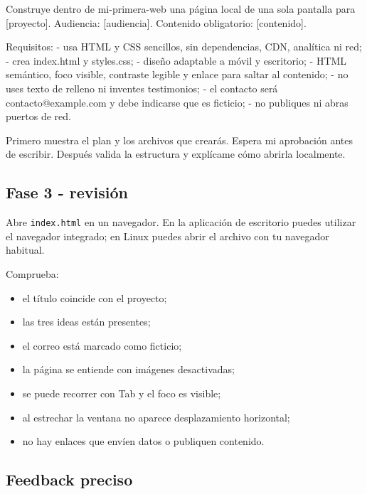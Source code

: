 \documentclass[10pt,a4paper,openany]{book}
\providecommand{\tightlist}{\setlength{\itemsep}{0.18em}\setlength{\parskip}{0pt}}
\newenvironment{Shaded}{}{}
\newcommand{\NormalTok}[1]{#1}
\renewenvironment{Shaded}
  {\begin{tcolorbox}[
    enhanced,
    breakable,
    colback=CodeBg,
    colframe=Border,
    boxrule=0.5pt,
    arc=2mm,
    left=3mm,
    right=3mm,
    top=2.2mm,
    bottom=2.2mm,
    before skip=0.8em,
    after skip=0.9em
  ]}
  {\end{tcolorbox}}
\begin{document}
\begin{Shaded}
\begin{Highlighting}[]
\NormalTok{Construye dentro de mi{-}primera{-}web una página local de una sola pantalla para}
\NormalTok{[proyecto]. Audiencia: [audiencia]. Contenido obligatorio: [contenido].}

\NormalTok{Requisitos:}
\NormalTok{{-} usa HTML y CSS sencillos, sin dependencias, CDN, analítica ni red;}
\NormalTok{{-} crea index.html y styles.css;}
\NormalTok{{-} diseño adaptable a móvil y escritorio;}
\NormalTok{{-} HTML semántico, foco visible, contraste legible y enlace para saltar al contenido;}
\NormalTok{{-} no uses texto de relleno ni inventes testimonios;}
\NormalTok{{-} el contacto será contacto@example.com y debe indicarse que es ficticio;}
\NormalTok{{-} no publiques ni abras puertos de red.}

\NormalTok{Primero muestra el plan y los archivos que crearás. Espera mi aprobación antes}
\NormalTok{de escribir. Después valida la estructura y explícame cómo abrirla localmente.}
\end{Highlighting}
\end{Shaded}

\subsection{Fase 3 - revisión}\label{fase-3---revisiuxf3n}

Abre \texttt{index.html} en un navegador. En la aplicación de escritorio
puedes utilizar el navegador integrado; en Linux puedes abrir el archivo
con tu navegador habitual.

Comprueba:

\begin{itemize}
\tightlist
\item
  el título coincide con el proyecto;
\item
  las tres ideas están presentes;
\item
  el correo está marcado como ficticio;
\item
  la página se entiende con imágenes desactivadas;
\item
  se puede recorrer con Tab y el foco es visible;
\item
  al estrechar la ventana no aparece desplazamiento horizontal;
\item
  no hay enlaces que envíen datos o publiquen contenido.
\end{itemize}

\subsection{Feedback preciso}\label{feedback-preciso}
\end{document}
